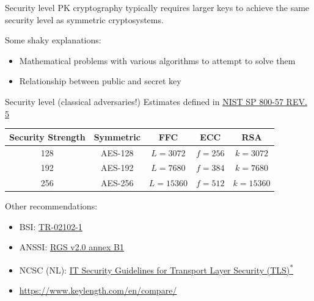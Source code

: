 \begin{frame}{Security level}
  PK cryptography typically requires larger keys to achieve the same security level as symmetric cryptosystems.

  \pause
  Some shaky explanations:
  \begin{itemize}[<+(1)->]
    \item Mathematical problems with various algorithms to attempt to solve them
    \item Relationship between public and secret key
  \end{itemize}
\end{frame}

\begin{frame}{Security level (classical adversaries!)}
  Estimates defined in \href{https://csrc.nist.gov/pubs/sp/800/57/pt1/r5/final}{NIST SP 800-57 REV. 5}

  \pause
  \begin{center}
  \begin{tabular}{@{}ccccc@{}}
    Security Strength & Symmetric & FFC & ECC & RSA\\
    \toprule
    128 & AES-128 & $L = 3072$  & $f = 256$ & $k = 3072$\\
    192 & AES-192 & $L = 7680$  & $f = 384$ & $k = 7680$\\
    256 & AES-256 & $L = 15360$ & $f = 512$ & $k = 15360$
  \end{tabular}
  \end{center}

  \pause
  Other recommendations:
  \begin{itemize}
    \item BSI: \href{https://www.bsi.bund.de/EN/Themen/Unternehmen-und-Organisationen/Standards-und-Zertifizierung/Technische-Richtlinien/TR-nach-Thema-sortiert/tr02102/tr02102_node.html}{TR-02102-1}
    \item ANSSI: \href{https://cyber.gouv.fr/le-referentiel-general-de-securite-version-20-les-documents}{RGS v2.0 annex B1}
    \item NCSC (NL): \href{https://english.ncsc.nl/publications/publications/2025/06/26/security-guidelines-for-transport-layer-security-2025-05}{IT Security Guidelines for
    Transport Layer Security (TLS)\textsuperscript{*}}
    \item {\scriptsize\url{https://www.keylength.com/en/compare/}}
  \end{itemize}
\end{frame}

